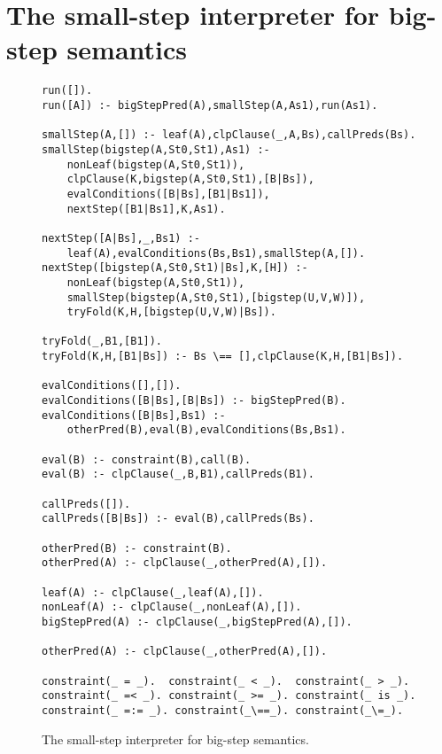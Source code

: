 \section{The small-step interpreter for big-step semantics}\label{appendix-interp}

\begin{figure}
\begin{lstlisting}[basicstyle=\scriptsize\ttfamily]
run([]).
run([A]) :- bigStepPred(A),smallStep(A,As1),run(As1).

smallStep(A,[]) :- leaf(A),clpClause(_,A,Bs),callPreds(Bs).
smallStep(bigstep(A,St0,St1),As1) :-
	nonLeaf(bigstep(A,St0,St1)),
	clpClause(K,bigstep(A,St0,St1),[B|Bs]),
	evalConditions([B|Bs],[B1|Bs1]),
	nextStep([B1|Bs1],K,As1).
	
nextStep([A|Bs],_,Bs1) :-
	leaf(A),evalConditions(Bs,Bs1),smallStep(A,[]).
nextStep([bigstep(A,St0,St1)|Bs],K,[H]) :-
	nonLeaf(bigstep(A,St0,St1)),
	smallStep(bigstep(A,St0,St1),[bigstep(U,V,W)]),
	tryFold(K,H,[bigstep(U,V,W)|Bs]).
	
tryFold(_,B1,[B1]).
tryFold(K,H,[B1|Bs]) :- Bs \== [],clpClause(K,H,[B1|Bs]).
	
evalConditions([],[]).
evalConditions([B|Bs],[B|Bs]) :- bigStepPred(B).
evalConditions([B|Bs],Bs1) :-
	otherPred(B),eval(B),evalConditions(Bs,Bs1).

eval(B) :- constraint(B),call(B).
eval(B) :- clpClause(_,B,B1),callPreds(B1).
	
callPreds([]).
callPreds([B|Bs]) :- eval(B),callPreds(Bs).
		
otherPred(B) :- constraint(B).
otherPred(A) :- clpClause(_,otherPred(A),[]).

leaf(A) :- clpClause(_,leaf(A),[]).
nonLeaf(A) :- clpClause(_,nonLeaf(A),[]).
bigStepPred(A) :- clpClause(_,bigStepPred(A),[]).

otherPred(A) :- clpClause(_,otherPred(A),[]).

constraint(_ = _).  constraint(_ < _).  constraint(_ > _).
constraint(_ =< _). constraint(_ >= _). constraint(_ is _).
constraint(_ =:= _). constraint(_\==_). constraint(_\=_).
\end{lstlisting}
\caption{The small-step interpreter for big-step semantics.}\label{fig:linear-bigstep-full}
\end{figure}



